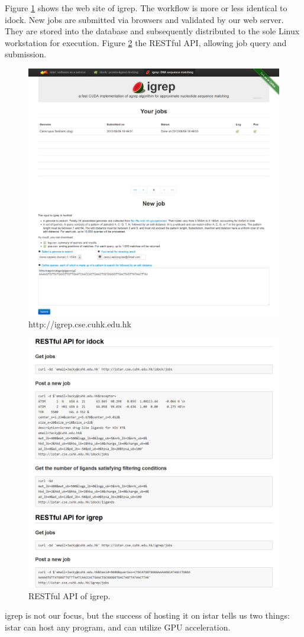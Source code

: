 Figure \ref{istar:igrep} shows the web site of igrep. The workflow is more or less identical to idock. New jobs are submitted via browsers and validated by our web server. They are stored into the database and subsequently distributed to the sole Linux workstation for execution. Figure \ref{istar:igrep-rest} the RESTful API, allowing job query and submission.

\begin{figure}
\centering
\includegraphics[width=\linewidth]{istar/igrep.png}
\caption{http://igrep.cse.cuhk.edu.hk}
\label{istar:igrep}
\end{figure}

\begin{figure}
\centering
\includegraphics[width=\linewidth]{istar/RESTfulAPI.png}
\caption{RESTful API of igrep.}
\label{istar:igrep-rest}
\end{figure}

igrep is not our focus, but the success of hosting it on istar tells us two things: istar can host any program, and can utilize GPU acceleration.

\chapterend
